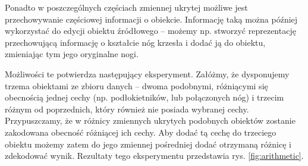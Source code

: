 \documentclass{iithesis}
\begin{document}
Ponadto w poszczególnych częściach zmiennej ukrytej możliwe jest przechowywanie
częściowej informacji o obiekcie. Informację taką można później wykorzystać
do edycji obiektu źródłowego -- możemy np. stworzyć reprezentację przechowującą
informację o kształcie nóg krzesła i dodać ją do obiektu, zmieniając tym jego oryginalne nogi.

Możliwości te potwierdza następujący eksperyment.
Załóżmy, że dysponujemy trzema obiektami ze zbioru danych -- dwoma podobnymi,
różniącymi się obecnością jednej cechy (np. podłokietników, lub połączonych nóg) i trzecim
różnym od poprzednich, który również nie posiada wybranej cechy.
Przypuszczamy, że w różnicy zmiennych ukrytych podobnych obiektów zostanie zakodowana obecność
różniącej ich cechy. Aby dodać tą cechę do trzeciego obiektu możemy zatem do jego zmiennej pośredniej
dodać otrzymaną różnicę i zdekodować wynik. Rezultaty tego eksperymentu
przedstawia rys. \ref{fig:arithmetic}.

\end{document}
